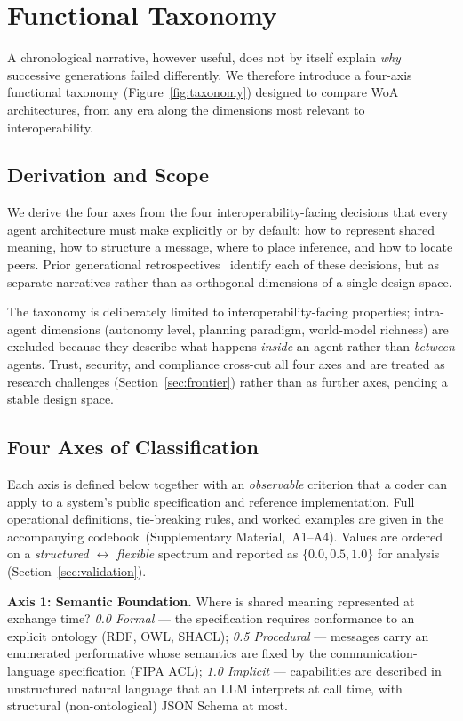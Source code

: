 \documentclass{IEEEcsmag}
\begin{document}
\section{Functional Taxonomy}\label{sec:taxonomy}

A chronological narrative, however useful, does not by itself explain \emph{why} successive generations failed differently. We therefore introduce a four-axis functional taxonomy (Figure~\ref{fig:taxonomy}) designed to compare WoA architectures, from any era along the dimensions most relevant to interoperability.

\subsection{Derivation and Scope}

We derive the four axes from the four interoperability-facing decisions that every agent architecture must make explicitly or by default: how to represent shared meaning, how to structure a message, where to place inference, and how to locate peers.  Prior generational retrospectives~\cite{Ciortea_2019, Hogan_2020} identify each of these decisions, but as separate narratives rather than as orthogonal dimensions of a single design space.

The taxonomy is deliberately limited to interoperability-facing properties; intra-agent dimensions (autonomy level, planning paradigm, world-model richness) are excluded because they describe what happens \emph{inside} an agent rather than \emph{between} agents.  Trust, security, and compliance cross-cut all four axes and are treated as research challenges (Section~\ref{sec:frontier}) rather than as further axes, pending a stable design space.

\subsection{Four Axes of Classification}

Each axis is defined below together with an \emph{observable} criterion that a coder can apply to a system's public specification and reference implementation.  Full operational definitions, tie-breaking rules, and worked examples are given in the accompanying codebook~(Supplementary Material, \textsection\,A1--A4).  Values are ordered on a \emph{structured $\leftrightarrow$ flexible} spectrum and reported as $\{0.0, 0.5, 1.0\}$ for analysis (Section~\ref{sec:validation}).

\textbf{Axis 1: Semantic Foundation.}  Where is shared meaning represented at exchange time?
\emph{0.0 Formal} --- the specification requires conformance to an explicit ontology (RDF, OWL, SHACL);
\emph{0.5 Procedural} --- messages carry an enumerated performative whose semantics are fixed by the communication-language specification (FIPA ACL);
\emph{1.0 Implicit} --- capabilities are described in unstructured natural language that an LLM interprets at call time, with structural (non-ontological) JSON Schema at most.
\end{document}

